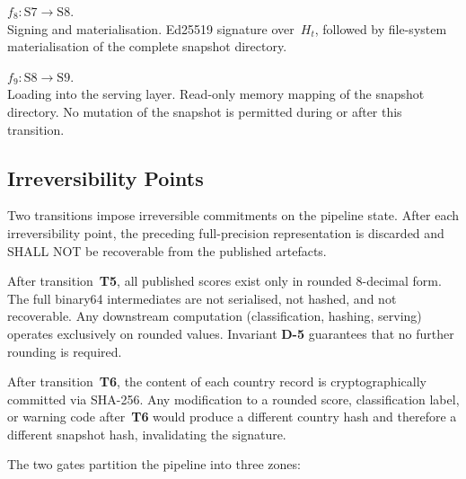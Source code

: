 \begin{description}[style=nextline, leftmargin=4em, labelwidth=3.5em]
  \item[\textbf{T8}] \(f_8 : \mathrm{S7} \to \mathrm{S8}\).\\
    Signing and materialisation.  Ed25519 signature over~\(H_t\), followed
    by file-system materialisation of the complete snapshot directory.

  \item[\textbf{T9}] \(f_9 : \mathrm{S8} \to \mathrm{S9}\).\\
    Loading into the serving layer.  Read-only memory mapping of the
    snapshot directory.  No mutation of the snapshot is permitted during or
    after this transition.

\end{description}

\subsection{Irreversibility Points}\label{sec:state:irreversibility}

Two transitions impose irreversible commitments on the pipeline state.
After each irreversibility point, the preceding full-precision
representation is discarded and SHALL NOT be recoverable from the
published artefacts.

\begin{description}[style=nextline, leftmargin=6.5em, labelwidth=6em]

  \item[\textbf{T5} (Rounding gate)]
    After transition~\textbf{T5}, all published scores exist only in
    rounded 8-decimal form.  The full binary64 intermediates are not
    serialised, not hashed, and not recoverable.  Any downstream
    computation (classification, hashing, serving) operates exclusively on
    rounded values.  Invariant \textbf{D-5} guarantees that no further
    rounding is required.

  \item[\textbf{T6} (Hashing gate)]
    After transition~\textbf{T6}, the content of each country record is
    cryptographically committed via SHA-256.  Any modification to a rounded
    score, classification label, or warning code after~\textbf{T6} would
    produce a different country hash and therefore a different snapshot hash,
    invalidating the signature.
\end{description}

The two gates partition the pipeline into three zones:

